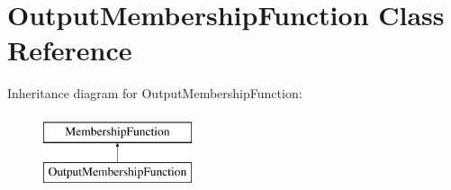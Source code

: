 \hypertarget{classOutputMembershipFunction}{
\section{OutputMembershipFunction Class Reference}
\label{classOutputMembershipFunction}
}
Inheritance diagram for OutputMembershipFunction:\begin{figure}[H]
\begin{center}
\leavevmode
\includegraphics[height=2.000000cm]{classOutputMembershipFunction}
\end{center}
\end{figure}
